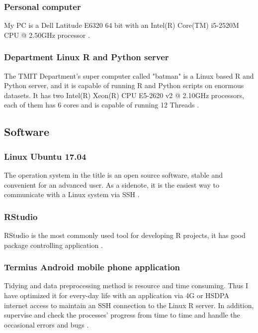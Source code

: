 			\subsubsection{Personal computer}
My PC is a Dell Latitude E6320 64 bit with an Intel(R) Core(TM) i5-2520M CPU @ 2.50GHz processor \cite{Latitude}.
			\subsubsection{Department Linux R and Python server}
The TMIT Department's super computer called "batman" is a Linux based R and Python server, and it is capable of running R and Python scripts on enormous datasets. It has two Intel(R) Xeon(R) CPU E5-2620 v2 @ 2.10GHz processors, each of them has 6 cores and is capable of running 12 Threads \cite{Batman}.
		\subsection{Software}
			\subsubsection{Linux Ubuntu 17.04}
The operation system in the title is an open source software, stable and convenient for an advanced user. As a sidenote, it is the easiest way to communicate with a Linux system \cite{Ubuntu} via SSH \cite{SSH}.
			\subsubsection{RStudio}
RStudio is the most commonly used tool for developing R projects, it has good package controlling application \cite{RStudio}.
			\subsubsection{Termius Android mobile phone application}
Tidying and data preprocessing method is resource and time consuming. Thus I have optimized it for every-day life with an application via 4G or HSDPA internet access to maintain an SSH connection to the Linux R server. In addition, supervise and check the processes' progress from time to time and handle the occasional errors and bugs \cite{Termius}.
